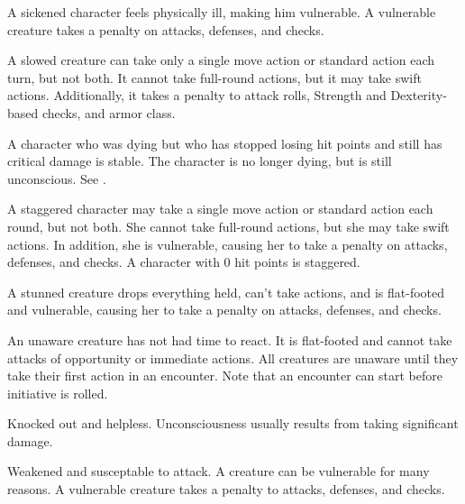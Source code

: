  A sickened character feels physically ill, making him vulnerable. A vulnerable creature takes a  penalty on attacks, defenses, and checks.

 A slowed creature can take only a single move action or standard action each turn, but not both. It cannot take full-round actions, but it may take swift actions. Additionally, it takes a  penalty to attack rolls, Strength and Dexterity-based checks, and armor class.

 A character who was dying but who has stopped losing hit points and still has critical damage is stable. The character is no longer dying, but is still unconscious. See .

 A staggered character may take a single move action or standard action each round, but not both. She cannot take full-round actions, but she may take swift actions. In addition, she is vulnerable, causing her to take a  penalty on attacks, defenses, and checks. A character with 0 hit points is staggered.

 A stunned creature drops everything held, can't take actions, and is flat-footed and vulnerable, causing her to take a  penalty on attacks, defenses, and checks.

 An unaware creature has not had time to react. It is flat-footed and cannot take attacks of opportunity or immediate actions. All creatures are unaware until they take their first action in an encounter. Note that an encounter can start before initiative is rolled.

 Knocked out and helpless. Unconsciousness usually results from taking significant damage. 

 Weakened and susceptable to attack. A creature can be vulnerable for many reasons. A vulnerable creature takes a  penalty to attacks, defenses, and checks.
